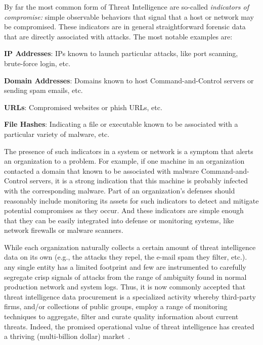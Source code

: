 \begin{dissertationintroduction}
By far the most common form of Threat Intelligence are so-called 
\emph{indicators of compromise:} simple observable behaviors that 
signal that a host or network may be compromised. These indicators 
are in general straightforward forensic data that are directly 
associated with attacks. The most notable examples are:
\begin{prettylist}
    \item \textbf{IP Addresses}: IPs known to launch particular 
    attacks, like port scanning, brute-force login, etc.
    \item \textbf{Domain Addresses}: Domains known to host 
    Command-and-Control servers or sending spam emails, etc.
    \item \textbf{URLs}: Compromised websites or phish URLs, etc.
    \item \textbf{File Hashes}: Indicating a file or executable 
    known to be associated with a particular variety of malware, etc.
\end{prettylist}

The presence of such indicators in a system or network is a symptom 
that alerts an organization to a problem. For example, if one 
machine in an organization contacted a domain that known to be
associated with malware Command-and-Control servers, it is a strong
indication that this machine is probably infected with the 
corresponding malware. Part of an organization's defenses 
should reasonably include monitoring its assets
for such indicators to detect and mitigate potential compromises as
they occur. And these indicators are simple enough that they can be
easily integrated into defense or monitoring systems, like network
firewalls or malware scanners.

While each organization naturally collects a certain amount of threat
intelligence data on its own (e.g., the attacks they repel, the e-mail
spam they filter, etc.). any single entity has a limited footprint and
few are instrumented to carefully segregate crisp signals of attacks
from the range of ambiguity found in normal production network and
system logs. Thus, it is now commonly accepted that threat
intelligence data procurement is a specialized activity whereby
third-party firms, and/or collections of public groups, employ a range
of monitoring techniques to aggregate, filter and curate quality
information about current threats.  Indeed, the promised operational
value of threat intelligence has created a thriving (multi-billion
dollar) market~\cite{timarket}. 


\end{dissertationintroduction}
